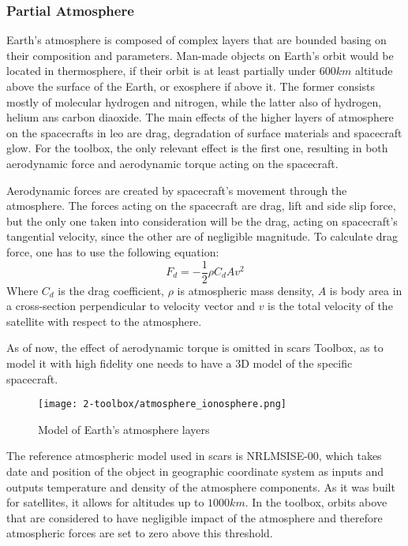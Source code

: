     \subsubsection{Partial Atmosphere}\label{toolbox:atmosphere}
        Earth's atmosphere is composed of complex layers that are bounded basing on their composition and parameters. Man-made objects on Earth's orbit would be located in thermosphere, if their orbit is at least partially under $600km$ altitude above the surface of the Earth, or exosphere if above it. The former consists mostly of molecular hydrogen and nitrogen, while the latter also of hydrogen, helium ans carbon diaoxide. The main effects of the higher layers of atmosphere on the spacecrafts in \ac{leo} are drag, degradation of surface materials and spacecraft glow. For the toolbox, the only relevant effect is the first one, resulting in both aerodynamic force and aerodynamic torque acting on the spacecraft.

        Aerodynamic forces are created by spacecraft's movement through the atmosphere. The forces acting on the spacecraft are drag, lift and side slip force, but the only one taken into consideration will be the drag, acting on spacecraft's tangential velocity, since the other are of negligible magnitude. To calculate drag force, one has to use the following equation:
        \begin{equation}
            F_d = -\frac{1}{2}\rho C_d A v^2
        \end{equation}
        Where $C_d$ is the drag coefficient, $\rho$ is atmospheric mass density, $A$ is body area in a cross-section perpendicular to velocity vector and $v$ is the total velocity of the satellite with respect to the atmosphere.

        As of now, the effect of aerodynamic torque is omitted in \ac{scars} Toolbox, as to model it with high fidelity one needs to have a 3D model of the specific spacecraft.


        \begin{figure}[H]
            \centering
            \texttt{[image: 2-toolbox/atmosphere\_ionosphere.png]}
            \caption{Model of Earth's atmosphere layers}
            \label{fig:atmosphere}
        \end{figure}

        The reference atmospheric model used in \ac{scars} is NRLMSISE-00, which takes date and position of the object in geographic coordinate system as inputs and outputs temperature and density of the atmosphere components. As it was built for satellites, it allows for altitudes up to $1000km$. In the toolbox, orbits above that are considered to have negligible impact of the atmosphere and therefore atmospheric forces are set to zero above this threshold.

